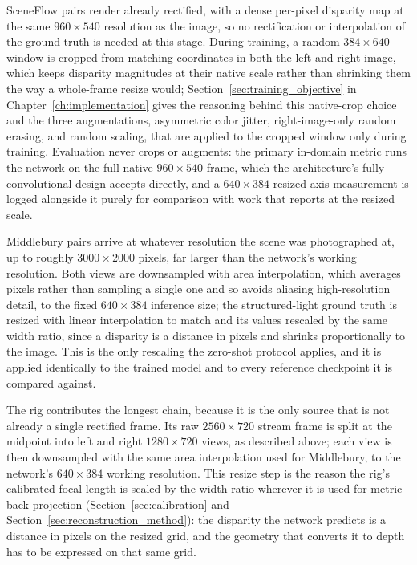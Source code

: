 SceneFlow pairs render already rectified, with a dense per-pixel
disparity map at the same $960\times540$ resolution as the image, so no
rectification or interpolation of the ground truth is needed at this
stage. During training, a random $384\times640$ window is cropped from
matching coordinates in both the left and right image, which keeps
disparity magnitudes at their native scale rather than shrinking them
the way a whole-frame resize would; Section~\ref{sec:training_objective}
in Chapter~\ref{ch:implementation} gives the reasoning behind this
native-crop choice and the three augmentations, asymmetric color jitter,
right-image-only random erasing, and random scaling, that are applied to
the cropped window only during training. Evaluation never crops or
augments: the primary in-domain metric runs the network on the full
native $960\times540$ frame, which the architecture's fully convolutional
design accepts directly, and a $640\times384$ resized-axis measurement is
logged alongside it purely for comparison with work that reports at the
resized scale.

Middlebury pairs arrive at whatever resolution the scene was
photographed at, up to roughly $3000\times2000$ pixels, far larger than
the network's working resolution. Both views are downsampled with
area interpolation, which averages pixels rather than sampling a single
one and so avoids aliasing high-resolution detail, to the fixed
$640\times384$ inference size; the structured-light ground truth is
resized with linear interpolation to match and its values rescaled by
the same width ratio, since a disparity is a distance in pixels and
shrinks proportionally to the image. This is the only rescaling the
zero-shot protocol applies, and it is applied identically to the trained
model and to every reference checkpoint it is compared against.

The rig contributes the longest chain, because it is the only source
that is not already a single rectified frame. Its raw $2560\times720$
stream frame is split at the midpoint into left and right $1280\times720$
views, as described above; each view is then downsampled with the same
area interpolation used for Middlebury, to the network's $640\times384$
working resolution. This resize step is the reason the rig's calibrated
focal length is scaled by the width ratio wherever it is used for metric
back-projection (Section~\ref{sec:calibration} and
Section~\ref{sec:reconstruction_method}): the disparity the network
predicts is a distance in pixels on the resized grid, and the geometry
that converts it to depth has to be expressed on that same grid.

